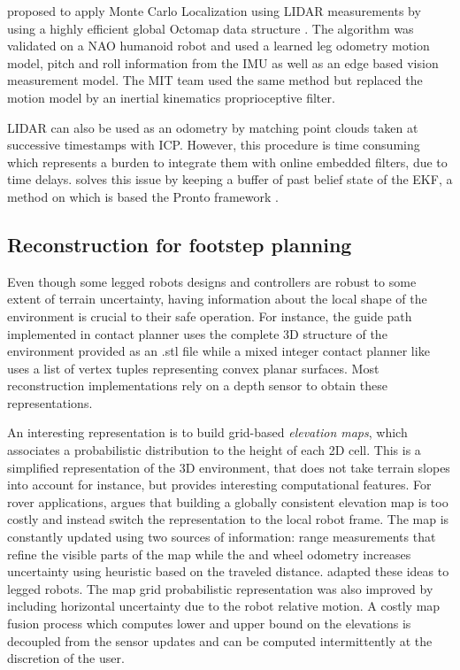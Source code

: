 \cite{hornung2014monte} proposed to apply Monte Carlo Localization using LIDAR measurements by using a highly efficient global Octomap data structure \cite{hornung2013octomap}.
The algorithm was validated on a NAO humanoid robot and used a learned leg odometry motion model, pitch and roll information from the IMU as well as an edge based vision measurement model.
The MIT team \cite{fallon2014drift} used the same method but replaced the motion model by an inertial kinematics proprioceptive filter. 

LIDAR can also be used as an odometry by matching point clouds taken at successive timestamps with ICP. However, this procedure is time consuming 
which represents a burden to integrate them with online embedded filters, due to time delays. \cite{nobili2017heterogeneous} solves this issue by keeping a
buffer of past belief state of the EKF, a method on which is based the Pronto framework \cite{camurri2020pronto}.



\subsection{Reconstruction for footstep planning}
Even though some legged robots designs and controllers \cite{reher2019dynamic, bledt2018cheetah} are robust to some extent of terrain uncertainty, having information about the local
shape of the environment is crucial to their safe operation. For instance, the guide path implemented in contact planner \cite{tonneau2018efficient} uses the complete 3D structure of the environment
provided as an .stl file while a mixed integer contact planner like \cite{tonneau2020sl1m} uses a list of vertex tuples representing convex planar surfaces.
Most reconstruction implementations rely on a depth sensor to obtain these representations.

An interesting representation is to build grid-based \textit{elevation maps}, which associates a probabilistic distribution to the height of each 2D cell. 
This is a simplified representation of the 3D environment, that does not take terrain slopes into account for instance, but provides interesting computational features. 
For rover applications, \cite{kleiner2007real} argues that building a globally consistent elevation map is too costly and instead switch the representation to the local robot frame. 
The map is constantly updated using two sources of information: range measurements that refine the visible parts of the map while the and wheel odometry increases uncertainty using heuristic
based on the traveled distance. \cite{fankhauser2014robot, fankhauser2018probabilistic} adapted these ideas to legged robots. The map grid probabilistic representation
was also improved by including horizontal uncertainty due to the robot relative motion. A costly map fusion process which computes lower and upper bound on the elevations
is decoupled from the sensor updates and can be computed intermittently at the discretion of the user. 

